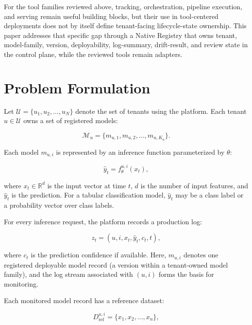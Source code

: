 \documentclass[runningheads]{llncs}
\begin{document}
For the tool families reviewed above, tracking, orchestration, pipeline execution, and serving remain useful building blocks, but their use in tool-centered deployments does not by itself define tenant-facing lifecycle-state ownership. This paper addresses that specific gap through a Native Registry that owns tenant, model-family, version, deployability, log-summary, drift-result, and review state in the control plane, while the reviewed tools remain adapters.

\section{Problem Formulation}

Let $\mathcal{U}=\{u_1,u_2,\ldots,u_N\}$ denote the set of tenants using the platform. Each tenant $u \in \mathcal{U}$ owns a set of registered models:

\begin{equation}
\mathcal{M}_u=\{m_{u,1},m_{u,2},\ldots,m_{u,K_u}\}.
\end{equation}

Each model $m_{u,i}$ is represented by an inference function parameterized by $\theta$:

\begin{equation}
\hat{y}_t=f_{\theta}^{u,i}(x_t),
\end{equation}

where $x_t \in \mathbb{R}^{d}$ is the input vector at time $t$, $d$ is the number of input features, and $\hat{y}_t$ is the prediction. For a tabular classification model, $\hat{y}_t$ may be a class label or a probability vector over class labels.

For every inference request, the platform records a production log:

\begin{equation}
z_t=(u,i,x_t,\hat{y}_t,c_t,t),
\end{equation}

where $c_t$ is the prediction confidence if available. Here, $m_{u,i}$ denotes one registered deployable model record (a version within a tenant-owned model family), and the log stream associated with $(u,i)$ forms the basis for monitoring.

Each monitored model record has a reference dataset:

\begin{equation}
D_{\mathrm{ref}}^{u,i}=\{x_1,x_2,\ldots,x_n\},
\end{equation}
\end{document}

